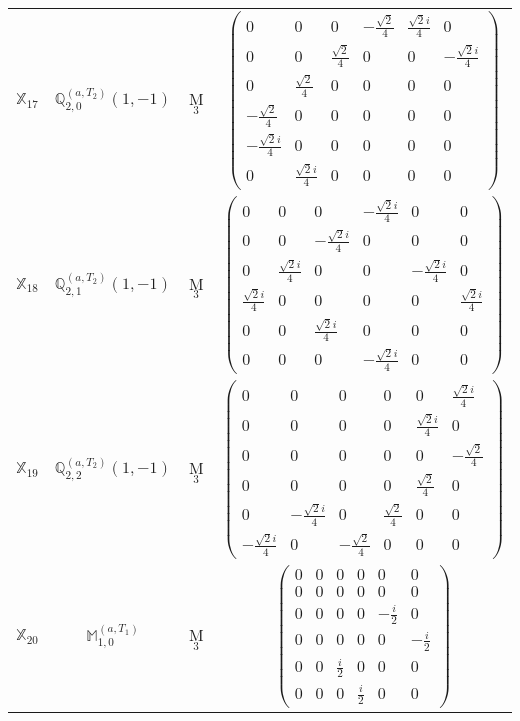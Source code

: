 \documentclass[fleqn,10pt,landscape]{article}
\begin{document}
\begin{itemize}
\begin{center}
\begin{longtable}{c|c|c|c}
$ \mathbb{X}_{17} $ & $\mathbb{Q}_{2,0}^{(a,T_{2})}(1,-1)$ & M$_{3}$ & $\begin{pmatrix} 0 & 0 & 0 & - \frac{\sqrt{2}}{4} & \frac{\sqrt{2} i}{4} & 0 \\ 0 & 0 & \frac{\sqrt{2}}{4} & 0 & 0 & - \frac{\sqrt{2} i}{4} \\ 0 & \frac{\sqrt{2}}{4} & 0 & 0 & 0 & 0 \\ - \frac{\sqrt{2}}{4} & 0 & 0 & 0 & 0 & 0 \\ - \frac{\sqrt{2} i}{4} & 0 & 0 & 0 & 0 & 0 \\ 0 & \frac{\sqrt{2} i}{4} & 0 & 0 & 0 & 0 \end{pmatrix}$ \\
$ \mathbb{X}_{18} $ & $\mathbb{Q}_{2,1}^{(a,T_{2})}(1,-1)$ & M$_{3}$ & $\begin{pmatrix} 0 & 0 & 0 & - \frac{\sqrt{2} i}{4} & 0 & 0 \\ 0 & 0 & - \frac{\sqrt{2} i}{4} & 0 & 0 & 0 \\ 0 & \frac{\sqrt{2} i}{4} & 0 & 0 & - \frac{\sqrt{2} i}{4} & 0 \\ \frac{\sqrt{2} i}{4} & 0 & 0 & 0 & 0 & \frac{\sqrt{2} i}{4} \\ 0 & 0 & \frac{\sqrt{2} i}{4} & 0 & 0 & 0 \\ 0 & 0 & 0 & - \frac{\sqrt{2} i}{4} & 0 & 0 \end{pmatrix}$ \\
$ \mathbb{X}_{19} $ & $\mathbb{Q}_{2,2}^{(a,T_{2})}(1,-1)$ & M$_{3}$ & $\begin{pmatrix} 0 & 0 & 0 & 0 & 0 & \frac{\sqrt{2} i}{4} \\ 0 & 0 & 0 & 0 & \frac{\sqrt{2} i}{4} & 0 \\ 0 & 0 & 0 & 0 & 0 & - \frac{\sqrt{2}}{4} \\ 0 & 0 & 0 & 0 & \frac{\sqrt{2}}{4} & 0 \\ 0 & - \frac{\sqrt{2} i}{4} & 0 & \frac{\sqrt{2}}{4} & 0 & 0 \\ - \frac{\sqrt{2} i}{4} & 0 & - \frac{\sqrt{2}}{4} & 0 & 0 & 0 \end{pmatrix}$ \\
$ \mathbb{X}_{20} $ & $\mathbb{M}_{1,0}^{(a,T_{1})}$ & M$_{3}$ & $\begin{pmatrix} 0 & 0 & 0 & 0 & 0 & 0 \\ 0 & 0 & 0 & 0 & 0 & 0 \\ 0 & 0 & 0 & 0 & - \frac{i}{2} & 0 \\ 0 & 0 & 0 & 0 & 0 & - \frac{i}{2} \\ 0 & 0 & \frac{i}{2} & 0 & 0 & 0 \\ 0 & 0 & 0 & \frac{i}{2} & 0 & 0 \end{pmatrix}$ \\

\end{longtable}
\end{center}
\end{itemize}
\end{document}
